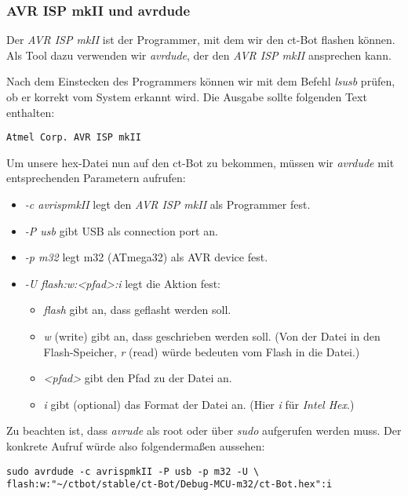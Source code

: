 \subsubsection{AVR ISP mkII und avrdude}
Der \textit{AVR ISP mkII} ist der Programmer, mit dem wir den ct-Bot flashen können. Als Tool dazu verwenden wir \textit{avrdude}, der den \textit{AVR ISP mkII} ansprechen kann.

Nach dem Einstecken des Programmers können wir mit dem Befehl \textit{lsusb} prüfen, ob er korrekt vom System erkannt wird. Die Ausgabe sollte folgenden Text enthalten:
\begin{lstlisting}
Atmel Corp. AVR ISP mkII
\end{lstlisting}

Um unsere hex-Datei nun auf den ct-Bot zu bekommen, müssen wir \textit{avrdude} mit entsprechenden Parametern aufrufen:
\begin{itemize}
\item \textit{-c avrispmkII} legt den \textit{AVR ISP mkII} als Programmer fest.
\item \textit{-P usb} gibt USB als connection port an.
\item \textit{-p m32} legt m32 (ATmega32) als AVR device fest.
\item \textit{-U flash:w:<pfad>:i} legt die Aktion fest:
	\begin{itemize}
	\item \textit{flash} gibt an, dass geflasht werden soll.
	\item \textit{w} (write) gibt an, dass geschrieben werden soll. (Von der Datei in den Flash-Speicher, \textit{r} (read) würde bedeuten vom Flash in die Datei.)
	\item \textit{<pfad>} gibt den Pfad zu der Datei an.
	\item \textit{i} gibt (optional) das Format der Datei an. (Hier \textit{i} für \textit{Intel Hex}.)
	\end{itemize}
\end{itemize}
Zu beachten ist, dass \textit{avrude} als root oder über \textit{sudo} aufgerufen werden muss.
Der konkrete Aufruf würde also folgendermaßen aussehen:
\begin{lstlisting}
sudo avrdude -c avrispmkII -P usb -p m32 -U \
flash:w:"~/ctbot/stable/ct-Bot/Debug-MCU-m32/ct-Bot.hex":i
\end{lstlisting}

